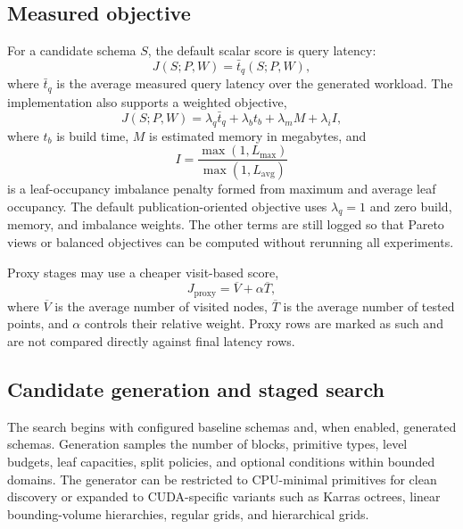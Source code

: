 \subsection{Measured objective}

For a candidate schema $S$, the default scalar score is query latency:
\begin{equation}
J(S;P,W) = \bar{t}_q(S;P,W),
\end{equation}
where $\bar{t}_q$ is the average measured query latency over the generated workload. The implementation also supports a weighted objective,
\begin{equation}
J(S;P,W) =
\lambda_q \bar{t}_q +
\lambda_b t_b +
\lambda_m M +
\lambda_i I,
\end{equation}
where $t_b$ is build time, $M$ is estimated memory in megabytes, and
\begin{equation}
I = \frac{\max(1, L_{\max})}{\max(1, L_{\mathrm{avg}})}
\end{equation}
is a leaf-occupancy imbalance penalty formed from maximum and average leaf occupancy. The default publication-oriented objective uses $\lambda_q=1$ and zero build, memory, and imbalance weights. The other terms are still logged so that Pareto views or balanced objectives can be computed without rerunning all experiments.

Proxy stages may use a cheaper visit-based score,
\begin{equation}
J_{\mathrm{proxy}} = \overline{V} + \alpha \overline{T},
\end{equation}
where $\overline{V}$ is the average number of visited nodes, $\overline{T}$ is the average number of tested points, and $\alpha$ controls their relative weight. Proxy rows are marked as such and are not compared directly against final latency rows.

\subsection{Candidate generation and staged search}

The search begins with configured baseline schemas and, when enabled, generated schemas. Generation samples the number of blocks, primitive types, level budgets, leaf capacities, split policies, and optional conditions within bounded domains. The generator can be restricted to CPU-minimal primitives for clean discovery or expanded to CUDA-specific variants such as Karras octrees, linear bounding-volume hierarchies, regular grids, and hierarchical grids.

